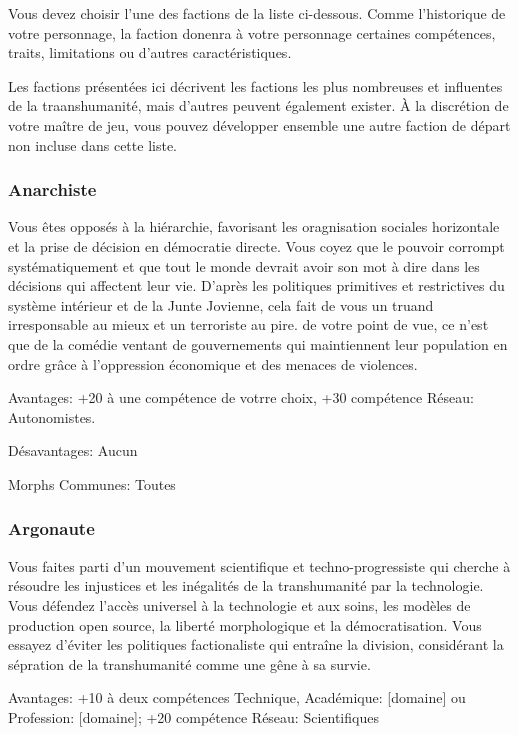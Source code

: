 Vous devez choisir l'une des factions de la liste ci-dessous. Comme l'historique de votre personnage, la faction donenra à votre personnage certaines compétences, traits, limitations ou d'autres caractéristiques. 

Les factions présentées ici décrivent les factions les plus nombreuses et influentes de la traanshumanité, mais d'autres peuvent également exister. À la discrétion de votre maître de jeu, vous pouvez développer ensemble une autre faction de départ non incluse dans cette liste. 

\subsubsection{Anarchiste} \label{sec:anarchist} 

Vous êtes opposés à la hiérarchie, favorisant les oragnisation sociales horizontale et la prise de décision en démocratie directe. Vous coyez que le pouvoir corrompt systématiquement et que tout le monde devrait avoir son mot à dire dans les décisions qui affectent leur vie. D'après les politiques primitives et restrictives du système intérieur et de la Junte Jovienne, cela fait de vous un truand irresponsable au mieux et un terroriste au pire. de votre point de vue, ce n'est que de la comédie ventant de gouvernements qui maintiennent leur population en ordre grâce à l'oppression économique et des menaces de violences. 

Avantages: +20 à une compétence de votrre choix, +30 compétence Réseau: Autonomistes. 

Désavantages: Aucun 

Morphs Communes: Toutes 

\subsubsection{Argonaute} \label{sec:argonaut} 

Vous faites parti d'un mouvement scientifique et techno-progressiste qui cherche à résoudre les injustices et les inégalités de la transhumanité par la technologie. Vous défendez l'accès universel à la technologie et aux soins, les modèles de production open source, la liberté morphologique et la démocratisation. Vous essayez d'éviter les politiques factionaliste qui entraîne la division, considérant la sépration de la transhumanité comme une gêne à sa survie. 

Avantages: +10 à deux compétences Technique, Académique: [domaine] ou Profession: [domaine]; +20 compétence Réseau: Scientifiques 

